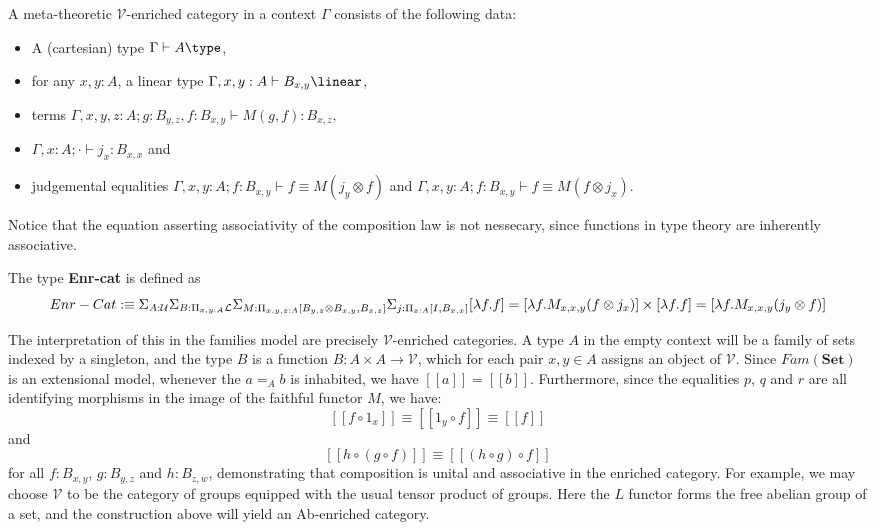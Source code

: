 \begin{defn}
  A meta-theoretic $\mathcal{V}$-enriched category in a context $\Gamma$ consists of the following data:
 \begin{itemize}
\item A (cartesian) type $\Gamma \vdash A \type$,
\item for any $x, y : A$, a linear type $\Gamma, x, y : A \vdash B_{x, y} \linear$,
\item terms $\Gamma, x, y, z : A; g: B_{y, z}, f:  B_{x, y} \vdash M(g, f) : B_{x, z}$,
\item $\Gamma, x : A; \cdot \vdash j_x : B_{x, x}$ and
\item judgemental equalities $\Gamma, x, y : A; f : B_{x, y} \vdash f \equiv M(j_y \otimes f)$ and $\Gamma, x, y : A; f : B_{x, y} \vdash f \equiv M(f \otimes j_x)$.
\end{itemize}
\end{defn}
Notice that the equation asserting associativity of the composition law is not nessecary, since functions in type theory are inherently associative.
\begin{defn}
  The type \textbf{Enr-cat} is defined as
  \[
    Enr-Cat :\equiv \Sigma_{A : \mathcal{U}} \Sigma_{B : \Pi_{x, y : A}\mathcal{L}} \Sigma_{M : \Pi_{x, y, z : A} [B_{y, z} \otimes B_{x, y}, B_{x,z}]} \Sigma_{j : \Pi_{x: A}[I, B_{x, x}]}[\lambda f. f] = [\lambda f. M_{x, x, y}(f \otimes j_x)] \times [\lambda f. f] = [\lambda f. M_{x, x, y}(j_y \otimes f)] \\
  \]
\end{defn}
The interpretation of this in the families model are precisely $\mathcal{V}$-enriched categories. A type $A$ in the empty context will be a family of sets indexed by a singleton, and the type $B$ is a function $B : A \times A \to \mathcal{V}$, which for each pair $x, y \in A$ assigns an object of $\mathcal{V}$.
Since $Fam(\mathbf{Set})$ is an extensional model, whenever the $a =_A b$ is inhabited, we have $[[a]]=[[b]]$. Furthermore, since the equalities $p$, $q$ and $r$ are all identifying morphisms in the image of the faithful functor $M$, we have:
\[
[[f \circ 1_x ]] \equiv [[1_y \circ f]] \equiv [[f]]
\]
and
\[
[[h \circ (g \circ f)]] \equiv [[(h \circ g) \circ f]]
\]
for all $f : B_{x,y}$, $g : B_{y,z}$ and $h : B_{z,w}$, demonstrating that composition is unital and associative in the enriched category.
For example, we may choose $\mathcal{V}$ to be the category of groups equipped with the usual tensor product of groups. Here the $L$ functor forms the free abelian group of a set, and the construction above will yield an Ab-enriched category.
